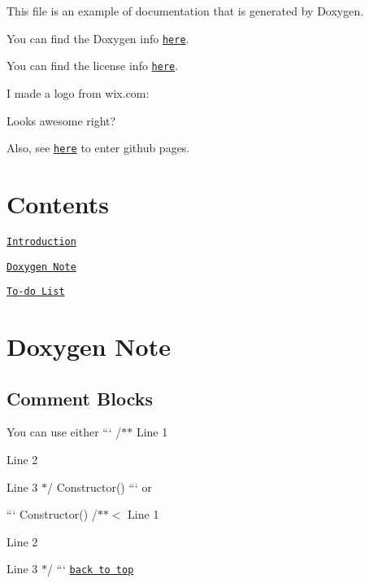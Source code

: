 This file is an example of documentation that is generated by Doxygen.

You can find the Doxygen info \href{http://www.stack.nl/~dimitri/doxygen/index.html}{\tt here}.

You can find the license info \href{https://choosealicense.com/}{\tt here}.

I made a logo from wix.\+com\+:



Looks awesome right?

Also, see \href{https://chao8219.github.io/doxygen-example/}{\tt here} to enter github pages.

\section*{Contents}


\begin{DoxyEnumerate}
\item \href{#doxygen-example}{\tt Introduction}
\item \href{#doxygen-note}{\tt Doxygen Note}
\item \href{#to-do-list}{\tt To-\/do List}
\end{DoxyEnumerate}

\section*{Doxygen Note}

\subsection*{Comment Blocks}


\begin{DoxyEnumerate}
\item You can use either ``` /$\ast$$\ast$ Line 1
\begin{DoxyItemize}
\item Line 2
\item Line 3 $\ast$/ Constructor() ``` or
\end{DoxyItemize}

``` Constructor() /$\ast$$\ast$$<$ Line 1
\begin{DoxyItemize}
\item Line 2
\item Line 3 $\ast$/ ``` \href{#contents}{\tt back to top}
\end{DoxyItemize}
\end{DoxyEnumerate}

